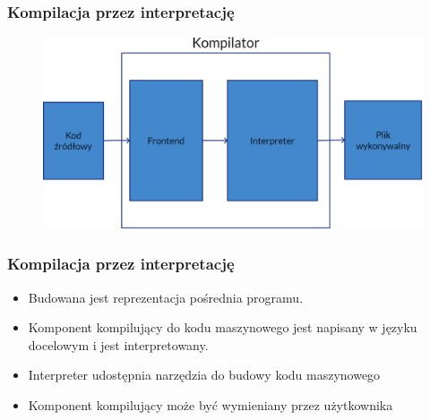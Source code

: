 \begin{frame}
	\frametitle{Kompilacja przez interpretację}

	\begin{figure}
		\includegraphics[width=\textwidth]{../assets/compilerouterdiagram.png}
	\end{figure}

\end{frame}

\begin{frame}
	\frametitle{Kompilacja przez interpretację}

	\begin{itemize}
		\item Budowana jest reprezentacja pośrednia programu.
		\item Komponent kompilujący do kodu maszynowego jest napisany w języku docelowym i jest interpretowany.
		\item Interpreter udostępnia narzędzia do budowy kodu maszynowego
		\item Komponent kompilujący może być wymieniany przez użytkownika
	\end{itemize}

\end{frame}

